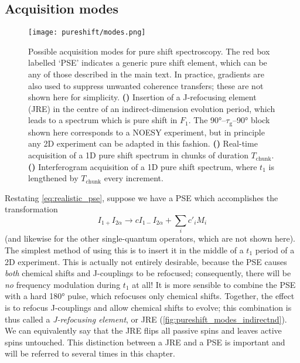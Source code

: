 \subsection{Acquisition modes}
\label{subsec:pureshift__acquisition_modes}

\begin{figure}[htbp]
    \centering
    \texttt{[image: pureshift/modes.png]}%
    {\label{fig:pureshift_modes_indirectnd}}%
    {\label{fig:pureshift_modes_realtime}}%
    {\label{fig:pureshift_modes_interferogram}}%
    \caption[Pure shift acquisition modes]{
        Possible acquisition modes for pure shift spectroscopy.
        The red box labelled `PSE' indicates a generic pure shift element, which can be any of those described in the main text.
        In practice, gradients are also used to suppress unwanted coherence transfers; these are not shown here for simplicity.
        \textbf{()} Insertion of a J-refocusing element (JRE) in the centre of an indirect-dimension evolution period, which leads to a spectrum which is pure shift in $F_1$.
        The \ang{90}--$\tau_\mathrm{g}$--\ang{90} block shown here corresponds to a NOESY experiment, but in principle any 2D experiment can be adapted in this fashion.
        \textbf{()} Real-time acquisition of a 1D pure shift spectrum in chunks of duration $T_\text{chunk}$.
        \textbf{()} Interferogram acquisition of a 1D pure shift spectrum, where $t_1$ is lengthened by $T_\text{chunk}$ every increment.
    }
    \label{fig:pureshift_modes}
\end{figure}

Restating \cref{eq:realistic_pse}, suppose we have a PSE which accomplishes the transformation
\begin{equation}
    \label{eq:pse_revisited}
    I_{1+}I_{2\alpha} \longrightarrow c I_{1-}I_{2\alpha} + \sum_i c'_i M_i
\end{equation}
(and likewise for the other single-quantum operators, which are not shown here).
The simplest method of using this is to insert it in the middle of a $t_1$ period of a 2D experiment.
This is actually not entirely desirable, because the PSE causes \textit{both} chemical shifts and J-couplings to be refocused; consequently, there will be \textit{no} frequency modulation during $t_1$ at all!
It is more sensible to combine the PSE with a hard \ang{180} pulse, which refocuses only chemical shifts.
Together, the effect is to refocus J-couplings and allow chemical shifts to evolve; this combination is thus called a \textit{J-refocusing element}, or JRE (\cref{fig:pureshift_modes_indirectnd}).
We can equivalently say that the JRE flips all passive spins and leaves active spins untouched.
This distinction between a JRE and a PSE is important and will be referred to several times in this chapter.

